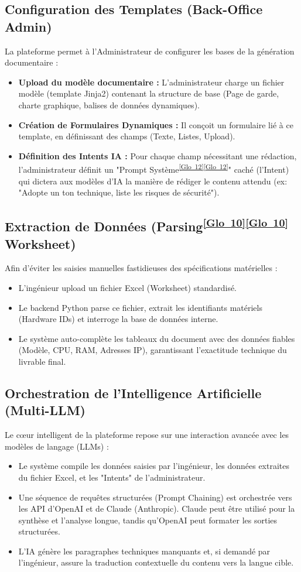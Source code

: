\documentclass[12pt, a4paper]{report}
\newcommand{\gloref}[1]{\textsuperscript{\hyperlink{glo:#1}{[Glo~#1]}}}
\begin{document}
\subsection{Configuration des Templates (Back-Office Admin)}
La plateforme permet à l'Administrateur de configurer les bases de la génération documentaire :
\begin{itemize}
    \item \textbf{Upload du modèle documentaire :} L'administrateur charge un fichier modèle (template Jinja2) contenant la structure de base (Page de garde, charte graphique, balises de données dynamiques).
    \item \textbf{Création de Formulaires Dynamiques :} Il conçoit un formulaire lié à ce template, en définissant des champs (Texte, Listes, Upload).
    \item \textbf{Définition des Intents IA :} Pour chaque champ nécessitant une rédaction, l'administrateur définit un "Prompt Système\gloref{12}\gloref{12}" caché (l'Intent) qui dictera aux modèles d'IA la manière de rédiger le contenu attendu (ex: "Adopte un ton technique, liste les risques de sécurité").
\end{itemize}

\subsection{Extraction de Données (Parsing\gloref{10}\gloref{10} Worksheet)}
Afin d'éviter les saisies manuelles fastidieuses des spécifications matérielles :
\begin{itemize}
    \item L'ingénieur upload un fichier Excel (Worksheet) standardisé.
    \item Le backend Python parse ce fichier, extrait les identifiants matériels (Hardware IDs) et interroge la base de données interne.
    \item Le système auto-complète les tableaux du document avec des données fiables (Modèle, CPU, RAM, Adresses IP), garantissant l'exactitude technique du livrable final.
\end{itemize}

\subsection{Orchestration de l'Intelligence Artificielle (Multi-LLM)}
Le cœur intelligent de la plateforme repose sur une interaction avancée avec les modèles de langage (LLMs) :
\begin{itemize}
    \item Le système compile les données saisies par l'ingénieur, les données extraites du fichier Excel, et les "Intents" de l'administrateur.
    \item Une séquence de requêtes structurées (Prompt Chaining) est orchestrée vers les API d'OpenAI et de Claude (Anthropic). Claude peut être utilisé pour la synthèse et l'analyse longue, tandis qu'OpenAI peut formater les sorties structurées.
    \item L'IA génère les paragraphes techniques manquants et, si demandé par l'ingénieur, assure la traduction contextuelle du contenu vers la langue cible.
\end{itemize}
\end{document}
